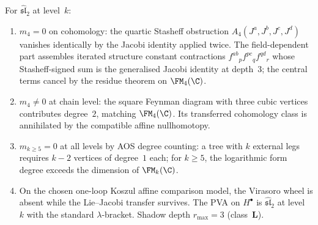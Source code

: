 \begin{proposition}
\label{prop:su2-truncation}
For $\widehat{\mathfrak{sl}}_2$ at level~$k$:
\begin{enumerate}[label=\textup{(\roman*)}]
\item $m_4 = 0$ on cohomology: the quartic Stasheff obstruction
 $A_4(J^a, J^b, J^c, J^d)$ vanishes identically by the Jacobi
 identity applied twice. The field-dependent part assembles
 iterated structure constant contractions
 $f^{ab}{}_p f^{pc}{}_q f^{qd}{}_r$ whose Stasheff-signed sum
 is the generalised Jacobi identity at depth~$3$; the central
 terms cancel by the residue theorem on $\FM_4(\C)$.
\item $m_4 \neq 0$ at chain level: the square Feynman diagram
 with three cubic vertices contributes degree~$2$, matching
 $\FM_4(\C)$. Its transferred cohomology class is annihilated by the
 compatible affine nullhomotopy.
\item $m_{k \geq 5} = 0$ at all levels by AOS degree counting:
 a tree with $k$ external legs requires $k-2$ vertices of
 degree~$1$ each; for $k \geq 5$, the logarithmic form degree
 exceeds the dimension of $\FM_k(\C)$.
\item On the chosen one-loop Koszul affine comparison model, the
 Virasoro wheel is absent while the Lie--Jacobi transfer survives.
 The PVA on $H^\bullet$ is $\widehat{\mathfrak{sl}}_2$ at level~$k$
 with the standard $\lambda$-bracket. Shadow depth $r_{\max} = 3$
 (class~$\mathbf{L}$).
\end{enumerate}
\end{proposition}

